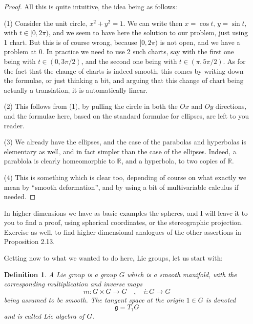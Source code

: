 \documentclass[12pt]{amsbook}
\newtheorem{definition}[theorem]{Definition}
\begin{document}
\begin{proof}
All this is quite intuitive, the idea being as follows:

\medskip

(1) Consider the unit circle, $x^2+y^2=1$. We can write then $x=\cos t$, $y=\sin t$, with $t\in[0,2\pi)$, and we seem to have here the solution to our problem, just using 1 chart. But this is of course wrong, because $[0,2\pi)$ is not open, and we have a problem at $0$. In practice we need to use 2 such charts, say with the first one being with $t\in(0,3\pi/2)$, and the second one being with $t\in(\pi,5\pi/2)$. As for the fact that the change of charts is indeed smooth, this comes by writing down the formulae, or just thinking a bit, and arguing that this change of chart being actually a translation, it is automatically linear.

\medskip

(2) This follows from (1), by pulling the circle in both the $Ox$ and $Oy$ directions, and the  formulae here, based on the standard formulae for ellipses, are left to you reader.

\medskip

(3) We already have the ellipses, and the case of the parabolas and hyperbolas is elementary as well, and in fact simpler than the case of the ellipses. Indeed, a parablola is clearly homeomorphic to $\mathbb R$, and a hyperbola, to two copies of $\mathbb R$.

\medskip

(4) This is something which is clear too, depending of course on what exactly we mean by ``smooth deformation'', and by using a bit of multivariable calculus if needed.
\end{proof}

In higher dimensions we have as basic examples the spheres, and I will leave it to you to find a proof, using spherical coordinates, or the stereographic projection. Exercise as well, to find higher dimensional analogues of the other assertions in Proposition 2.13.

\bigskip

Getting now to what we wanted to do here, Lie groups, let us start with:


\begin{definition}
A Lie group is a group $G$ which is a smooth manifold, with the corresponding multiplication and inverse maps
$$m:G\times G\to G\quad,\quad i:G\to G$$
being assumed to be smooth. The tangent space at the origin $1\in G$ is denoted
$$\mathfrak g=T_1G$$
and is called Lie algebra of $G$.
\end{definition}
\end{document}
